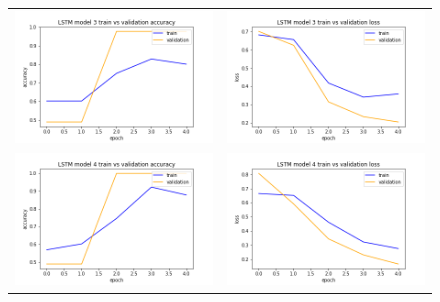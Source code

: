 \begin{figure}
\begin{tabular}{cc}
\includegraphics[width=6.5cm]{images/classifier/model-output-lstm-339/model-3-train-vs-validation-accuracy}&
\includegraphics[width=6.5cm]{images/classifier/model-output-lstm-339/model-3-train-vs-validation-loss}\\

\includegraphics[width=6.5cm]{images/classifier/model-output-lstm-339/model-4-train-vs-validation-accuracy}&
\includegraphics[width=6.5cm]{images/classifier/model-output-lstm-339/model-4-train-vs-validation-loss}\\


\end{tabular}
\end{figure}
